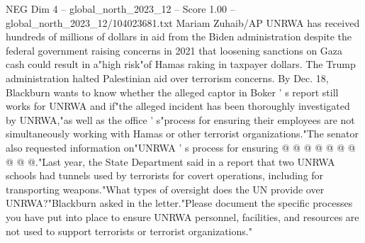 \begin{textsample}{NEG Dim 4 – global\_north\_2023\_12 – Score 1.00 – global\_north\_2023\_12/104023681.txt}
Mariam Zuhaib/AP UNRWA has received hundreds of millions of dollars in aid from the Biden administration despite the federal government raising concerns in 2021 that loosening sanctions on Gaza cash could result in a"high risk"of Hamas raking in taxpayer dollars.
The Trump administration halted Palestinian aid over terrorism concerns.
By Dec. 18, Blackburn wants to know whether the alleged captor in Boker ' s report still works for UNRWA and if"the alleged incident has been thoroughly investigated by UNRWA,"as well as the office ' s"process for ensuring their employees are not simultaneously working with Hamas or other terrorist organizations."The senator also requested information on"UNRWA ' s process for ensuring @ @ @ @ @ @ @ @ @ @."Last year, the State Department said in a report that two UNRWA schools had tunnels used by terrorists for covert operations, including for transporting weapons."What types of oversight does the UN provide over UNRWA?"Blackburn asked in the letter."Please document the specific processes you have put into place to ensure UNRWA personnel, facilities, and resources are not used to support terrorists or terrorist organizations."

\end{textsample}
